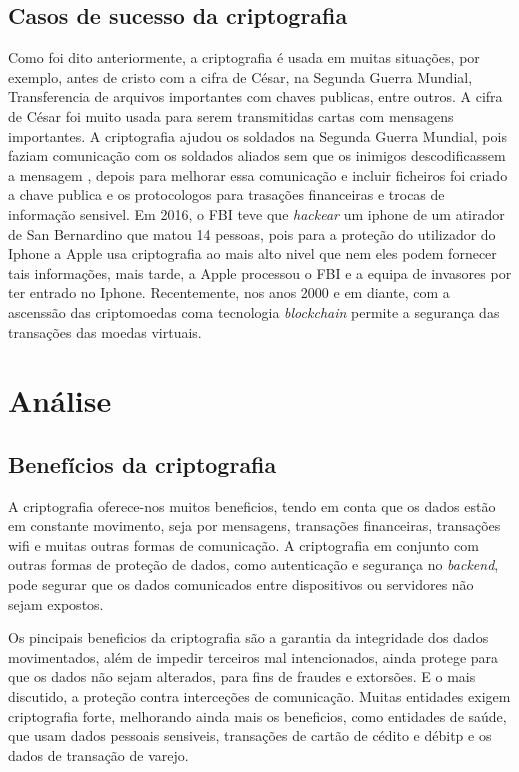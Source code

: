 \documentclass{report}
\begin{document}
\section{Casos de sucesso da criptografia}
Como foi dito anteriormente, a criptografia é usada em muitas situações, por exemplo, antes de cristo com a cifra de César, na Segunda Guerra Mundial, Transferencia de arquivos importantes com chaves publicas, entre outros.
A cifra de César foi muito usada para serem transmitidas cartas com mensagens importantes. A criptografia ajudou os soldados na Segunda Guerra Mundial, pois faziam comunicação com os soldados aliados sem que os inimigos descodificassem a mensagem \cite{ww2}, depois para melhorar essa comunicação e incluir ficheiros foi criado a chave publica e os protocologos  para trasações financeiras e trocas de informação sensivel. 
Em 2016, o FBI teve que \textit{hackear} um iphone de um atirador de San Bernardino que matou 14 pessoas, pois para a proteção do utilizador do Iphone a Apple usa criptografia ao mais alto nivel que nem eles podem fornecer tais informações, mais tarde, a Apple processou o FBI e a equipa de invasores por ter entrado no Iphone.\cite{apple}
Recentemente, nos anos 2000 e em diante, com a ascenssão das criptomoedas coma tecnologia \textit{blockchain} permite a segurança das transações das moedas virtuais.


\label{chap.resultados}


\chapter{Análise}
\label{chap.analise}
\section{Benefícios da criptografia}

A criptografia oferece-nos muitos beneficios, tendo em conta que os dados estão em constante movimento, seja por mensagens, transações financeiras, transações wifi e muitas outras formas de comunicação. A criptografia em conjunto com outras formas de proteção de dados, como autenticação e segurança no \textit{backend}, pode segurar que os dados comunicados entre dispositivos ou servidores não sejam expostos.

Os pincipais beneficios da criptografia são a garantia da integridade dos dados movimentados, além de impedir terceiros mal intencionados, ainda protege para que os dados não sejam alterados, para fins de fraudes e extorsões. E o mais discutido, a proteção contra interceções de comunicação.
Muitas entidades exigem criptografia forte, melhorando ainda mais os beneficios, como entidades de saúde, que usam dados pessoais sensiveis, transações de cartão de cédito e débitp e os dados de transação de varejo.\cite{google}
\end{document}
